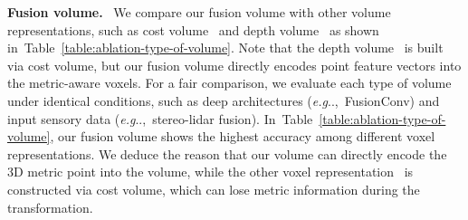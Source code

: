 \documentclass[letterpaper, 10 pt, conference]{ieeeconf}
\makeatletter
\DeclareRobustCommand\onedot{\futurelet\@let@token\@onedot}
\def\@onedot{\ifx\@let@token.\else.\null\fi\xspace}
\def\eg{\emph{e.g}\onedot} \def\Eg{{E.g}\onedot}
\def\ie{\emph{i.e}\onedot} \def\Ie{{I.e}\onedot}
\def\etal{\emph{et al}\onedot}
\newcommand{\Tref}[1]{Table~\textcolor{blue}{\ref{#1}}}
\makeatother
\begin{document}
\begin{table}[!t]
    \centering
    \caption{\textbf{Ablation study of the type of volume for depth estimation.} We differentiate the type of volume as cost volume~\cite{gcnet} (\ie,~CostV), depth volume (\ie,~DepthV) by You~\etal~\cite{pseudo-lidar++}, and our fusion volume  (\ie,~ FusionV). 
    Note that depth volume (\ie,~DepthV) by You~\etal~\cite{pseudo-lidar++} is a transformed volume from the cost volume, but our method directly interpolates sensor data into our volume .
    We evaluate each method on the KITTI completion validation benchmark~\cite{kitti-completion}. 
    }
    \vspace{-2mm}
    \label{table:ablation-type-of-volume}
    \vspace{-4mm}
\end{table}


\noindent \textbf{Fusion volume.} \
We compare our fusion volume with other volume representations, such as cost volume~\cite{gcnet} and depth volume~\cite{pseudo-lidar++} as shown in~\Tref{table:ablation-type-of-volume}. Note that the depth volume~\cite{pseudo-lidar++} is built via cost volume, but our fusion volume directly encodes point feature vectors  into the metric-aware voxels. For a fair comparison, we evaluate each type of volume under identical conditions, such as deep architectures (\eg,~FusionConv) and input sensory data (\eg,~stereo-lidar fusion). In~\Tref{table:ablation-type-of-volume}, our fusion volume shows the highest accuracy among different voxel representations. We deduce the reason that our volume can directly encode the 3D metric point into the volume, while the other voxel representation~\cite{pseudo-lidar++} is constructed via cost volume, which can lose metric information during the transformation.
\end{document}

